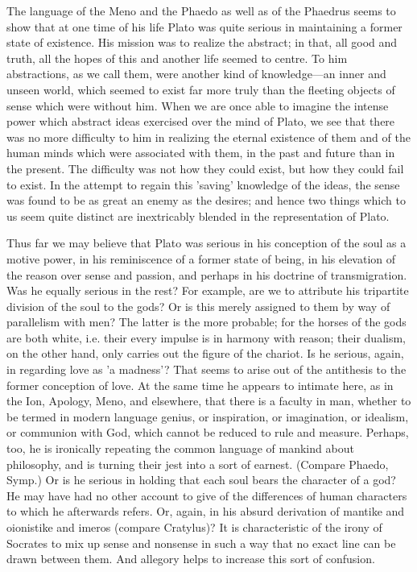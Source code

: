 \documentclass[11pt,letter]{article}
\begin{document}
\par  The language of the Meno and the Phaedo as well as of the Phaedrus seems to show that at one time of his life Plato was quite serious in maintaining a former state of existence. His mission was to realize the abstract; in that, all good and truth, all the hopes of this and another life seemed to centre. To him abstractions, as we call them, were another kind of knowledge—an inner and unseen world, which seemed to exist far more truly than the fleeting objects of sense which were without him. When we are once able to imagine the intense power which abstract ideas exercised over the mind of Plato, we see that there was no more difficulty to him in realizing the eternal existence of them and of the human minds which were associated with them, in the past and future than in the present. The difficulty was not how they could exist, but how they could fail to exist. In the attempt to regain this 'saving' knowledge of the ideas, the sense was found to be as great an enemy as the desires; and hence two things which to us seem quite distinct are inextricably blended in the representation of Plato.

\par  Thus far we may believe that Plato was serious in his conception of the soul as a motive power, in his reminiscence of a former state of being, in his elevation of the reason over sense and passion, and perhaps in his doctrine of transmigration. Was he equally serious in the rest? For example, are we to attribute his tripartite division of the soul to the gods? Or is this merely assigned to them by way of parallelism with men? The latter is the more probable; for the horses of the gods are both white, i.e. their every impulse is in harmony with reason; their dualism, on the other hand, only carries out the figure of the chariot. Is he serious, again, in regarding love as 'a madness'? That seems to arise out of the antithesis to the former conception of love. At the same time he appears to intimate here, as in the Ion, Apology, Meno, and elsewhere, that there is a faculty in man, whether to be termed in modern language genius, or inspiration, or imagination, or idealism, or communion with God, which cannot be reduced to rule and measure. Perhaps, too, he is ironically repeating the common language of mankind about philosophy, and is turning their jest into a sort of earnest. (Compare Phaedo, Symp.) Or is he serious in holding that each soul bears the character of a god? He may have had no other account to give of the differences of human characters to which he afterwards refers. Or, again, in his absurd derivation of mantike and oionistike and imeros (compare Cratylus)? It is characteristic of the irony of Socrates to mix up sense and nonsense in such a way that no exact line can be drawn between them. And allegory helps to increase this sort of confusion.
\end{document}
